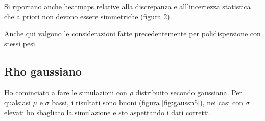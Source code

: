 \documentclass[a4paper,12pt,twoside,openright]{report}
\begin{document}
\begin{figure}[ht]
	\caption{}
	\label{fig:diffn5rhopoli}
\end{figure}

Si riportano anche heatmaps relative alla discrepanza e all'incertezza statistica che a priori non devono essere simmetriche (figura \ref{fig:errordiffn5rhopoli}).
\begin{figure}[!ht]
	\centering
	\caption{}
	\label{fig:errordiffn5rhopoli}
\end{figure}
Anche qui valgono le considerazioni fatte precedentemente per polidispersione con stessi pesi


\subsection{Rho gaussiano}
\label{subsec:5dimrhogauss}

Ho cominciato a fare le simulazioni con $\rho$ distribuito secondo gaussiana. Per qualsiasi $\mu$ e $\sigma$ bassi, i risultati sono buoni (figura \ref{fig:gaussn5}), nei casi con $\sigma$ elevati ho sbagliato la simulazione e sto aspettando i dati corretti.
\end{document}

